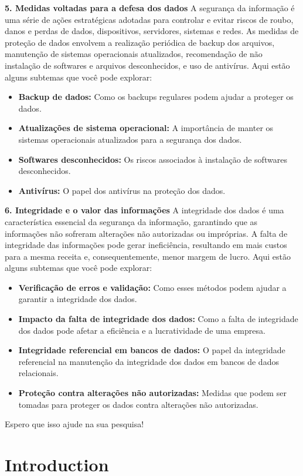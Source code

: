\documentclass[10pt,conference,twocolumn]{article}
\begin{document}
\textbf{5. Medidas voltadas para a defesa dos dados} A segurança da informação é uma série de ações estratégicas adotadas para controlar e evitar riscos de roubo, danos e perdas de dados, dispositivos, servidores, sistemas e redes. As medidas de proteção de dados envolvem a realização periódica de backup dos arquivos, manutenção de sistemas operacionais atualizados, recomendação de não instalação de softwares e arquivos desconhecidos, e uso de antivírus. Aqui estão alguns subtemas que você pode explorar:
\begin{itemize}
    \item \textbf{Backup de dados:} Como os backups regulares podem ajudar a proteger os dados.

    \item \textbf{Atualizações de sistema operacional:} A importância de manter os sistemas operacionais atualizados para a segurança dos dados.

    \item \textbf{Softwares desconhecidos:} Os riscos associados à instalação de softwares desconhecidos.

    \item \textbf{Antivírus:} O papel dos antivírus na proteção dos dados.
\end{itemize}

\textbf{6. Integridade e o valor das informações} A integridade dos dados é uma característica essencial da segurança da informação, garantindo que as informações não sofreram alterações não autorizadas ou impróprias. A falta de integridade das informações pode gerar ineficiência, resultando em mais custos para a mesma receita e, consequentemente, menor margem de lucro. Aqui estão alguns subtemas que você pode explorar:
\begin{itemize}
    \item \textbf{Verificação de erros e validação:} Como esses métodos podem ajudar a garantir a integridade dos dados.

    \item \textbf{Impacto da falta de integridade dos dados:} Como a falta de integridade dos dados pode afetar a eficiência e a lucratividade de uma empresa.

    \item \textbf{Integridade referencial em bancos de dados:} O papel da integridade referencial na manutenção da integridade dos dados em bancos de dados relacionais.

    \item \textbf{Proteção contra alterações não autorizadas:} Medidas que podem ser tomadas para proteger os dados contra alterações não autorizadas.
\end{itemize}
Espero que isso ajude na sua pesquisa!

\section{Introduction}
\end{document}
